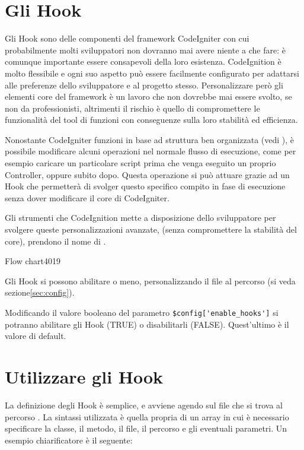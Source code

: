 \section{Gli Hook}
\label{cap:hook}

Gli Hook sono delle componenti del framework CodeIgniter con cui probabilmente molti sviluppatori non dovranno mai avere niente a che fare: è comunque importante essere consapevoli della loro esistenza. CodeIgnition è molto flessibile e ogni suo aspetto può essere facilmente configurato per adattarsi alle preferenze dello sviluppatore e al progetto stesso. Personalizzare però gli elementi core del framework è un lavoro che non dovrebbe mai essere svolto, se non da professionisti, altrimenti il rischio è quello di compromettere le funzionalità del tool di funzioni con conseguenze sulla loro stabilità ed efficienza.
 
Nonostante CodeIgniter funzioni in base ad struttura ben organizzata (vedi ), è possibile modificare alcuni operazioni nel normale flusso di esecuzione, come per esempio caricare un particolare script prima che venga eseguito un proprio Controller, oppure subito dopo. Questa operazione si può attuare grazie ad un Hook che permetterà di svolger questo specifico compito in fase di esecuzione senza dover modificare il core di CodeIgniter.

Gli strumenti che CodeIgnition mette a disposizione dello sviluppatore per svolgere queste personalizzazioni avanzate, (senza compromettere la stabilità del core), prendono il nome di .

\begin{img}{Flow chart}{4}{019}
\end{img}

Gli Hook si possono abilitare o meno, personalizzando il file  al percorso  (si veda sezione\vref{sec:config}).

Modificando il valore booleano del parametro \verb|$config['enable_hooks']| si potranno abilitare gli Hook (TRUE) o disabilitarli (FALSE). Quest'ultimo è il valore di default.

\section*{Utilizzare gli Hook}
La definizione degli Hook è semplice, e avviene agendo sul file  che si trova al percorso . La sintassi utilizzata è quella propria di un array in cui è necessario specificare la classe, il metodo, il file, il percorso e gli eventuali parametri. Un esempio chiarificatore è il seguente:

